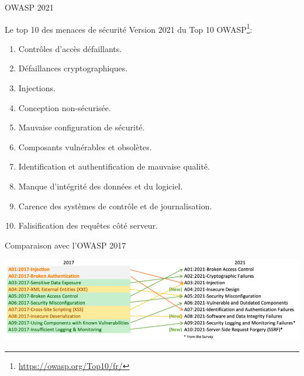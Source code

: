 \begin{frame}{OWASP 2021}
  \begin{block}{Le top 10 des menaces de sécurité}
    Version 2021 du Top 10 OWASP\footnote{\url{https://owasp.org/Top10/fr/}}:
    \begin{enumerate}
    \item Contrôles d'accès défaillants.
    \item Défaillances cryptographiques.
    \item Injections.
    \item Conception non-sécurisée.
    \item Mauvaise configuration de sécurité.
    \item Composants vulnérables et obsolètes.
    \item Identification et authentification de mauvaise qualité.
    \item Manque d'intégrité des données et du logiciel.
    \item Carence des systèmes de contrôle et de journalisation.
    \item Falisification des requêtes côté serveur.
    \end{enumerate}
  \end{block}
\end{frame}

\begin{frame}{Comparaison avec l'OWASP 2017}
  \begin{center}
    \includegraphics[scale=0.7]{images/owasp_mapping.png}
  \end{center}
\end{frame}

